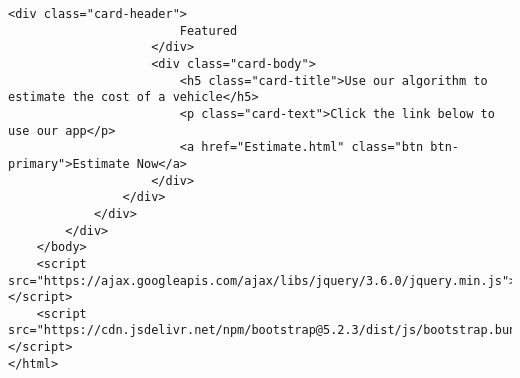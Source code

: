 \begin{lstlisting}[style=htmlcssjs]
                    <div class="card-header">
                        Featured
                    </div>
                    <div class="card-body">
                        <h5 class="card-title">Use our algorithm to estimate the cost of a vehicle</h5>
                        <p class="card-text">Click the link below to use our app</p>
                        <a href="Estimate.html" class="btn btn-primary">Estimate Now</a>
                    </div>
                </div>
            </div>
        </div>
    </body>
    <script src="https://ajax.googleapis.com/ajax/libs/jquery/3.6.0/jquery.min.js"></script>
    <script src="https://cdn.jsdelivr.net/npm/bootstrap@5.2.3/dist/js/bootstrap.bundle.min.js"></script>
</html>
\end{lstlisting}
